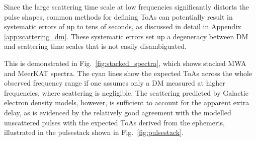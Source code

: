 \documentclass[fleqn,usenatbib]{mnras}
\newcommand{\Fig}{Fig.}
\begin{document}
Since the large scattering time scale at low frequencies significantly distorts the pulse shapes, common methods for defining ToAs can potentially result in systematic errors of up to tens of seconds, as discussed in detail in Appendix \ref{app:scattering_dm}.
These systematic errors set up a degeneracy between DM and scattering time scales that is not easily disambiguated.

This is demonstrated in \Fig~\ref{fig:stacked_spectra}, which shows stacked MWA and MeerKAT spectra.
The cyan lines show the expected ToAs across the whole observed frequency range if one assumes only a DM measured at higher frequencies, where scattering is negligible.
The scattering predicted by Galactic electron density models, however, is sufficient to account for the apparent extra delay, as is evidenced by the relatively good agreement with the modelled unscattered pulses with the expected ToAs derived from the ephemeris, illustrated in the pulsestack shown in \Fig~\ref{fig:pulsestack}.
\end{document}
